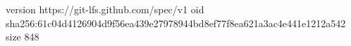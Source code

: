 version https://git-lfs.github.com/spec/v1
oid sha256:61c04d4126904d9f56ea439e27978944bd8ef77f8ea621a3ac4e441e1212a542
size 848

